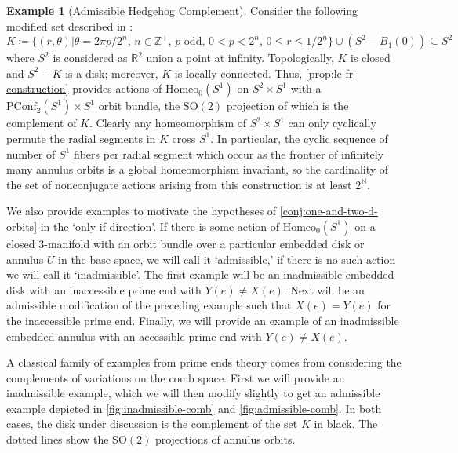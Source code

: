 \documentclass[10pt, oneside]{article}
\newcommand{\R}{\mathbb{R}}
\newcommand{\Z}{\mathbb{Z}}
\newcommand{\N}{\mathbb{N}}
\newcommand{\SO}[1][2]{\text{SO}(#1)}
\newcommand{\homeo}[1][S^1]{\text{Homeo}_0(#1)}
\newcommand{\pconf}[2][S^1]{\text{PConf}_{#2}(#1)}
\theoremstyle{definition}
\newtheorem{eg}{Example}[section]
\theoremstyle{definition}
\begin{document}
\begin{eg}[Admissible Hedgehog Complement]
    Consider the following modified set described in \cite{epstein:PrimeEnds}:
    $$K\coloneqq\{ (r, \theta) \vert \theta = 2\pi p/2^n,\, n\in \Z^+,\, p \text{ odd},\, 0 < p < 2^n,\, 0\leq r\leq 1/2^n\}\cup(S^2-B_1(0))\subseteq S^2$$
    where $S^2$ is considered as $\R^2$ union a point at infinity. Topologically, $K$ is closed and $S^2 - K$ is a disk; moreover, $K$ is locally connected. Thus, \cref{prop:lc-fr-construction} provides actions of $\homeo$ on $S^2\times S^1$ with a $\pconf{2}\times S^1$ orbit bundle, the $\SO$ projection of which is the complement of $K$. Clearly any homeomorphism of $S^2\times S^1$ can only cyclically permute the radial segments in $K$ cross $S^1$. In particular, the cyclic sequence of number of $S^1$ fibers per radial segment which occur as the frontier of infinitely many annulus orbits is a global homeomorphism invariant, so the cardinality of the set of nonconjugate actions arising from this construction is at least $2^\N$.
    
\end{eg}

We also provide examples to motivate the hypotheses of \cref{conj:one-and-two-d-orbits} in the `only if direction'. If there is some action of $\homeo$ on a closed 3-manifold with an orbit bundle over a particular embedded disk or annulus $U$ in the base space, we will call it `admissible,' if there is no such action we will call it `inadmissible'. The first example will be an inadmissible embedded disk with an inaccessible prime end with $Y(e)\neq X(e)$. Next will be an admissible modification of the preceding example such that $X(e) = Y(e)$ for the inaccessible prime end. Finally, we will provide an example of an inadmissible embedded annulus with an accessible prime end with $Y(e)\neq X(e)$.

A classical family of examples from prime ends theory comes from considering the complements of variations on the comb space. First we will provide an inadmissible example, which we will then modify slightly to get an admissible example depicted in \cref{fig:inadmissible-comb} and \cref{fig:admissible-comb}. In both cases, the disk under discussion is the complement of the set $K$ in black. The dotted lines show the $\SO$ projections of annulus orbits.
\end{document}
